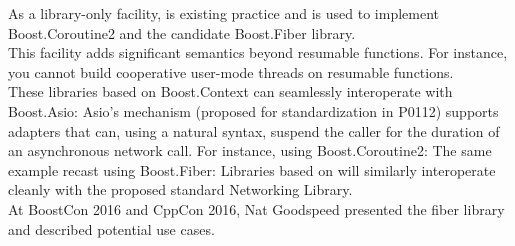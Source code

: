 \label{appendixa}
As a library-only facility,
\cite{bcontext} is existing practice
and is used to implement Boost.Coroutine2\cite{bcoroutine2} and the candidate
Boost.Fiber library\cite{bfiber}.\\
\newline
This facility adds significant semantics beyond resumable functions. For
instance, you cannot build cooperative user-mode threads on resumable
functions.\\
\newline
These libraries based on Boost.Context can seamlessly interoperate with
Boost.Asio\cite{basio}: Asio's  mechanism (proposed for
standardization in P0112\cite{P0112}) supports adapters that can, using a
natural syntax, suspend the caller for the duration of an asynchronous network
call. For instance, using Boost.Coroutine2:
The same example recast using Boost.Fiber:
Libraries based on \ectx will similarly interoperate cleanly with the proposed
standard Networking Library\cite{P0112}.\\
\newline
At BoostCon 2016\cite{boostcon} and CppCon 2016\cite{cppcon}, Nat Goodspeed
presented the fiber library and described potential use cases.
